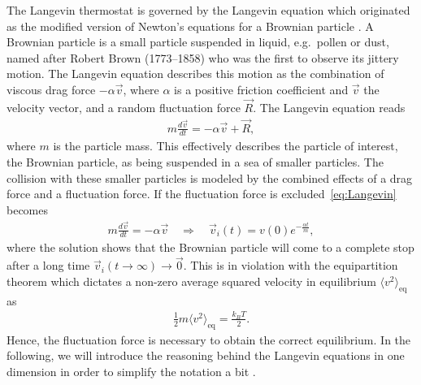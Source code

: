 The Langevin thermostat is governed by the Langevin equation which originated as the modified version of Newton's equations for a Brownian particle \cite{stat_phys}. A Brownian particle is a small particle suspended in liquid,
e.g.\ pollen or dust, named after Robert Brown (1773–1858) who was the first to
observe its jittery motion. The Langevin equation describes this motion as the
combination of viscous drag force $ -\alpha \vec{v}$, where $\alpha$ is a
positive friction coefficient and $\vec{v}$ the velocity vector, and a random
fluctuation force $\vec{R}$. The Langevin equation reads
\begin{align}
  m \frac{d \vec{v}}{dt} = -\alpha \vec{v} + \vec{R},
  \label{eq:Langevin}
\end{align}
where $m$ is the particle mass. This effectively describes the particle of
interest, the Brownian particle, as being suspended in a sea of smaller
particles. The collision with these smaller particles is modeled by the combined effects of a drag force and a fluctuation force. If the fluctuation force is excluded~\cref{eq:Langevin} becomes 
\begin{align*}
  m \frac{d \vec{v}}{dt} = -\alpha \vec{v} \quad \Rightarrow \quad 
  \vec{v}_i(t) = v(0)e^{- \frac{\alpha t}{m}},
\end{align*}
where the solution shows that the Brownian particle will come to a complete stop
after a long time ${\vec{v}_i(t\to\infty) \to \vec{0}}$. This is in violation
with the equipartition theorem which dictates a non-zero average squared velocity in equilibrium $\langle v^2 \rangle_{\text{eq}}$ as
\begin{align}
  \frac{1}{2}m\langle v^2 \rangle_{\text{eq}} = \frac{k_B T}{2}.
  \label{eq:equipartion}
\end{align}
Hence, the fluctuation force is necessary to obtain the correct equilibrium. In the following, we will introduce the reasoning behind the Langevin equations in one dimension in order to simplify the notation a bit \cite{stat_phys}.

